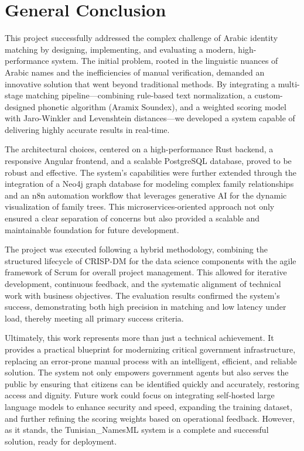\chapter*{General Conclusion}

This project successfully addressed the complex challenge of Arabic identity matching by designing, implementing, and evaluating a modern, high-performance system. The initial problem, rooted in the linguistic nuances of Arabic names and the inefficiencies of manual verification, demanded an innovative solution that went beyond traditional methods. By integrating a multi-stage matching pipeline—combining rule-based text normalization, a custom-designed phonetic algorithm (Aramix Soundex), and a weighted scoring model with Jaro-Winkler and Levenshtein distances—we developed a system capable of delivering highly accurate results in real-time.

The architectural choices, centered on a high-performance Rust backend, a responsive Angular frontend, and a scalable PostgreSQL database, proved to be robust and effective. The system's capabilities were further extended through the integration of a Neo4j graph database for modeling complex family relationships and an n8n automation workflow that leverages generative AI for the dynamic visualization of family trees. This microservices-oriented approach not only ensured a clear separation of concerns but also provided a scalable and maintainable foundation for future development.

The project was executed following a hybrid methodology, combining the structured lifecycle of CRISP-DM for the data science components with the agile framework of Scrum for overall project management. This allowed for iterative development, continuous feedback, and the systematic alignment of technical work with business objectives. The evaluation results confirmed the system's success, demonstrating both high precision in matching and low latency under load, thereby meeting all primary success criteria.

Ultimately, this work represents more than just a technical achievement. It provides a practical blueprint for modernizing critical government infrastructure, replacing an error-prone manual process with an intelligent, efficient, and reliable solution. The system not only empowers government agents but also serves the public by ensuring that citizens can be identified quickly and accurately, restoring access and dignity. Future work could focus on integrating self-hosted large language models to enhance security and speed, expanding the training dataset, and further refining the scoring weights based on operational feedback. However, as it stands, the Tunisian_NamesML system is a complete and successful solution, ready for deployment.